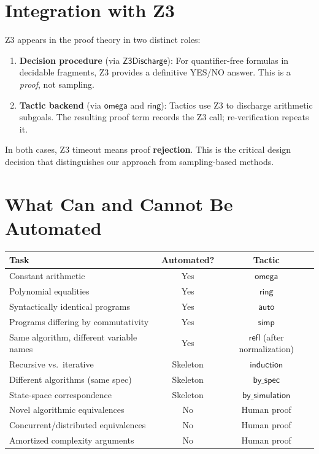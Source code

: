\section{Integration with Z3}

Z3 appears in the proof theory in two distinct roles:

\begin{enumerate}
\item \textbf{Decision procedure} (via $\mathsf{Z3Discharge}$):
  For quantifier-free formulas in decidable fragments, Z3 provides
  a definitive YES/NO answer.  This is a \emph{proof}, not sampling.

\item \textbf{Tactic backend} (via $\mathsf{omega}$ and $\mathsf{ring}$):
  Tactics use Z3 to discharge arithmetic subgoals.  The resulting
  proof term records the Z3 call; re-verification repeats it.
\end{enumerate}

In both cases, Z3 timeout means proof \textbf{rejection}.  This is
the critical design decision that distinguishes our approach from
sampling-based methods.


\section{What Can and Cannot Be Automated}

\begin{longtable}{p{6cm}cc}
\toprule
\textbf{Task} & \textbf{Automated?} & \textbf{Tactic} \\
\midrule
Constant arithmetic & Yes & $\mathsf{omega}$ \\
Polynomial equalities & Yes & $\mathsf{ring}$ \\
Syntactically identical programs & Yes & $\mathsf{auto}$ \\
Programs differing by commutativity & Yes & $\mathsf{simp}$ \\
Same algorithm, different variable names & Yes & $\mathsf{refl}$ (after normalization) \\
\midrule
Recursive vs.\ iterative & Skeleton & $\mathsf{induction}$ \\
Different algorithms (same spec) & Skeleton & $\mathsf{by\_spec}$ \\
State-space correspondence & Skeleton & $\mathsf{by\_simulation}$ \\
\midrule
Novel algorithmic equivalences & No & Human proof \\
Concurrent/distributed equivalences & No & Human proof \\
Amortized complexity arguments & No & Human proof \\
\bottomrule
\end{longtable}

